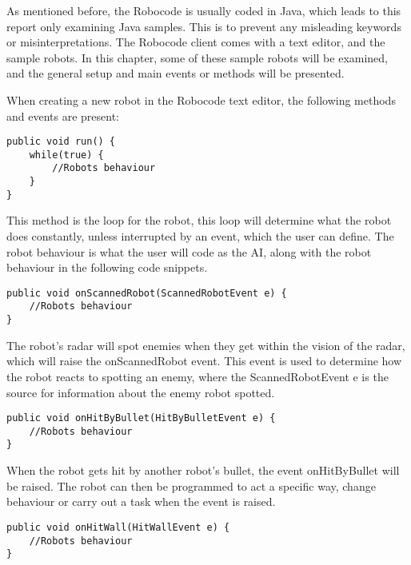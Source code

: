 As mentioned before, the Robocode is usually coded in Java, which leads to this report only examining Java samples. This is to prevent any misleading keywords or misinterpretations. The Robocode client comes with a text editor, and the sample robots. In this chapter, some of these sample robots will be examined, and the general setup and main events or methods will be presented.

When creating a new robot in the Robocode text editor, the following methods and events are present:

\begin{lstlisting}[caption={Eksampel of the main loop in Robocode} label=run, xleftmargin=.2\textwidth]
public void run() {
	while(true) {
		//Robots behaviour
	}
}
\end{lstlisting}

This method is the loop for the robot, this loop will determine what the robot does constantly, unless interrupted by an event, which the user can define. The robot behaviour is what the user will code as the AI, along with the robot behaviour in the following code snippets.

\begin{lstlisting}[caption={Eksampel of the onScannedRobot event from Robocode} label=osr, xleftmargin=.2\textwidth]
public void onScannedRobot(ScannedRobotEvent e) {
	//Robots behaviour
}
\end{lstlisting}

The robot’s radar will spot enemies when they get within the vision of the radar, which will raise the onScannedRobot event. This event is used to determine how the robot reacts to spotting an enemy, where the ScannedRobotEvent e is the source for information about the enemy robot spotted.

\begin{lstlisting}[caption={Eksampel of the onHitByBullet event event from Robocode} label=ohbb, xleftmargin=.2\textwidth]
public void onHitByBullet(HitByBulletEvent e) {
	//Robots behaviour
}
\end{lstlisting}

When the robot gets hit by another robot’s bullet, the event onHitByBullet will be raised. The robot can then be programmed to act a specific way, change behaviour or carry out a task when the event is raised.

\begin{lstlisting}[caption={Eksampel of the onHitWall event event from Robocode} label=ohw, xleftmargin=.2\textwidth]
public void onHitWall(HitWallEvent e) {
	//Robots behaviour
}
\end{lstlisting}

